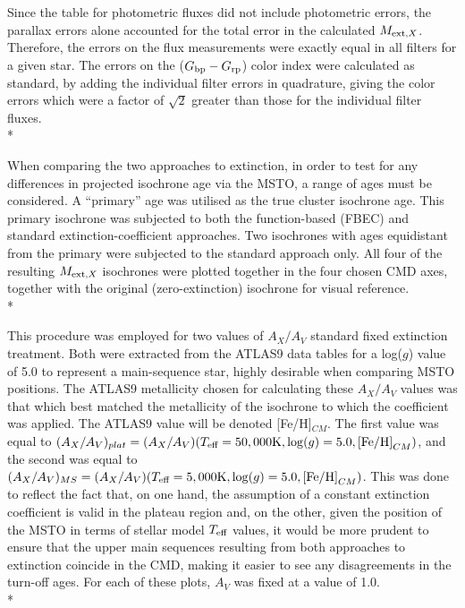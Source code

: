 \documentclass[12pt, a4paper]{report}
\begin{document}
Since the table for photometric fluxes did not include photometric errors, the parallax errors alone accounted for the total error in the calculated $M_{\textnormal{ext},X}$. Therefore, the errors on the flux measurements  were exactly equal in all filters for a given star. The errors on the ($G_{\textnormal{bp}}-G_{\textnormal{rp}}$) color index were calculated as standard, by adding the individual filter errors in quadrature, giving the color errors which were a factor of $\sqrt{2}$ greater than those for the individual filter fluxes.\\*

When comparing the two approaches to extinction, in order to test for any differences in projected isochrone age via the MSTO, a range of ages must be considered. A ``primary'' age was utilised as the true cluster isochrone age. This primary isochrone was subjected to both the function-based (FBEC) and standard extinction-coefficient approaches. Two isochrones with ages equidistant from the primary were subjected to the standard approach only. All four of the resulting $M_{\textnormal{ext},X}$ isochrones were plotted together in the four chosen CMD axes, together with the original (zero-extinction) isochrone for visual reference.\\*

This procedure was employed for two values of $A_{X}/A_{V}$ standard fixed extinction treatment. Both were extracted from the ATLAS9 data tables for a log($g$) value of 5.0 to represent a main-sequence star, highly desirable when comparing MSTO positions. The ATLAS9 metallicity chosen for calculating these $A_{X}/A_{V}$ values was that which best matched the metallicity of the isochrone to which the coefficient was applied. The ATLAS9 value will be denoted [Fe/H]$_{CM}$. The first value was equal to $(A_{X}/A_{V})_{plat} = (A_{X}/A_{V})(T_{\textnormal{eff}} = 50,000\textnormal{K},\log(g) = 5.0,\textnormal{[Fe/H]}_{CM})$, and the second was equal to $(A_{X}/A_{V})_{MS} = (A_{X}/A_{V})(T_{\textnormal{eff}} = 5,000\textnormal{K},\log(g) = 5.0,\textnormal{[Fe/H]}_{CM})$. This was done to reflect the fact that, on one hand, the assumption of a constant extinction coefficient is valid in the plateau region and, on the other, given the position of the MSTO in terms of stellar model $T_{\textnormal{eff}}$ values, it would be more prudent to ensure that the upper main sequences resulting from both approaches to extinction coincide in the CMD, making it easier to see any disagreements in the turn-off ages. For each of these plots, $A_{V}$ was fixed at a value of 1.0.\\*
\end{document}
